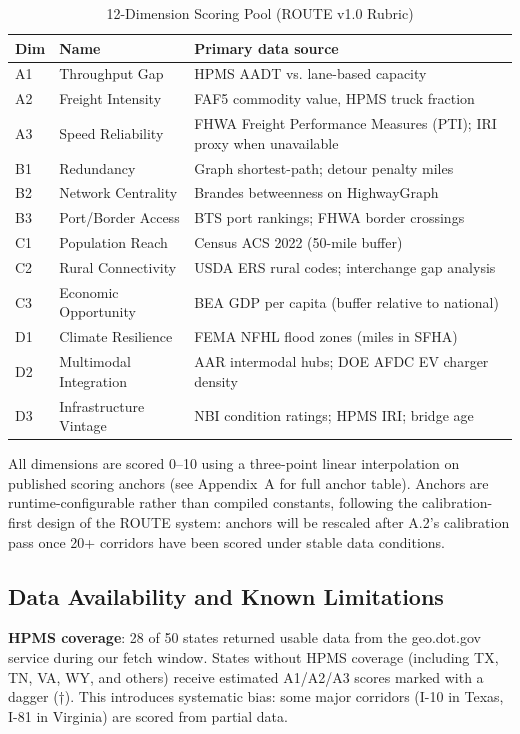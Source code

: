 \begin{table}[h!]
\centering
\caption{12-Dimension Scoring Pool (ROUTE v1.0 Rubric)}
\label{tab:dimensions}
\small
\begin{tabular}{llp{5.5cm}}
\toprule
\textbf{Dim} & \textbf{Name} & \textbf{Primary data source} \\
\midrule
A1 & Throughput Gap & HPMS AADT vs. lane-based capacity \\
A2 & Freight Intensity & FAF5 commodity value, HPMS truck fraction \\
A3 & Speed Reliability & FHWA Freight Performance Measures (PTI); IRI proxy when unavailable \\
\midrule
B1 & Redundancy & Graph shortest-path; detour penalty miles \\
B2 & Network Centrality & Brandes betweenness on HighwayGraph \\
B3 & Port/Border Access & BTS port rankings; FHWA border crossings \\
\midrule
C1 & Population Reach & Census ACS 2022 (50-mile buffer) \\
C2 & Rural Connectivity & USDA ERS rural codes; interchange gap analysis \\
C3 & Economic Opportunity & BEA GDP per capita (buffer relative to national) \\
\midrule
D1 & Climate Resilience & FEMA NFHL flood zones (miles in SFHA) \\
D2 & Multimodal Integration & AAR intermodal hubs; DOE AFDC EV charger density \\
D3 & Infrastructure Vintage & NBI condition ratings; HPMS IRI; bridge age \\
\bottomrule
\end{tabular}
\end{table}

All dimensions are scored 0--10 using a three-point linear interpolation on published scoring anchors (see Appendix~A for full anchor table). Anchors are runtime-configurable rather than compiled constants, following the calibration-first design of the ROUTE system: anchors will be rescaled after A.2's calibration pass once 20+ corridors have been scored under stable data conditions.

\subsection{Data Availability and Known Limitations}

\textbf{HPMS coverage}: 28 of 50 states returned usable data from the geo.dot.gov service during our fetch window. States without HPMS coverage (including TX, TN, VA, WY, and others) receive estimated A1/A2/A3 scores marked with a dagger (†). This introduces systematic bias: some major corridors (I-10 in Texas, I-81 in Virginia) are scored from partial data.


